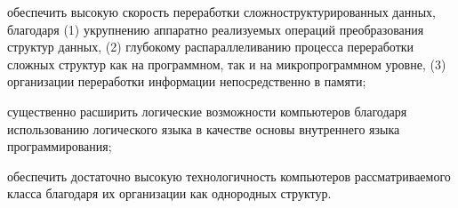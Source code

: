 \begin{scnsubstruct}
{\begin{scnitemize}
			\item обеспечить высокую скорость переработки сложноструктурированных данных, благодаря (1) укрупнению аппаратно реализуемых операций преобразования структур данных, (2) глубокому распараллеливанию процесса переработки сложных структур как на программном, так и на микропрограммном уровне, (3) организации переработки информации непосредственно в памяти;
			\item существенно расширить логические возможности компьютеров благодаря использованию логического языка в качестве основы внутреннего языка программирования;
			\item обеспечить достаточно высокую технологичность компьютеров рассматриваемого класса благодаря их организации как однородных структур.
		\end{scnitemize}
	}
	

\end{scnsubstruct}
